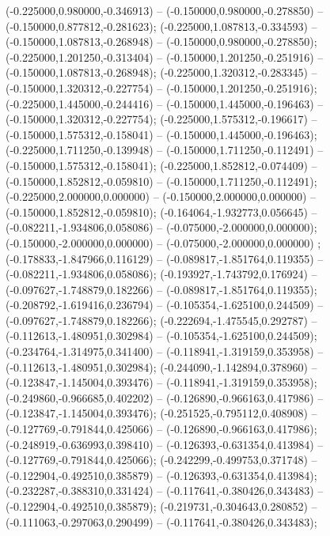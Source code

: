  (-0.225000,0.980000,-0.346913) -- (-0.150000,0.980000,-0.278850) -- (-0.150000,0.877812,-0.281623);
 (-0.225000,1.087813,-0.334593) -- (-0.150000,1.087813,-0.268948) -- (-0.150000,0.980000,-0.278850);
 (-0.225000,1.201250,-0.313404) -- (-0.150000,1.201250,-0.251916) -- (-0.150000,1.087813,-0.268948);
 (-0.225000,1.320312,-0.283345) -- (-0.150000,1.320312,-0.227754) -- (-0.150000,1.201250,-0.251916);
 (-0.225000,1.445000,-0.244416) -- (-0.150000,1.445000,-0.196463) -- (-0.150000,1.320312,-0.227754);
 (-0.225000,1.575312,-0.196617) -- (-0.150000,1.575312,-0.158041) -- (-0.150000,1.445000,-0.196463);
 (-0.225000,1.711250,-0.139948) -- (-0.150000,1.711250,-0.112491) -- (-0.150000,1.575312,-0.158041);
 (-0.225000,1.852812,-0.074409) -- (-0.150000,1.852812,-0.059810) -- (-0.150000,1.711250,-0.112491);
 (-0.225000,2.000000,0.000000) -- (-0.150000,2.000000,0.000000) -- (-0.150000,1.852812,-0.059810);
 (-0.164064,-1.932773,0.056645) -- (-0.082211,-1.934806,0.058086) -- (-0.075000,-2.000000,0.000000);
 (-0.150000,-2.000000,0.000000) -- (-0.075000,-2.000000,0.000000) ;
 (-0.178833,-1.847966,0.116129) -- (-0.089817,-1.851764,0.119355) -- (-0.082211,-1.934806,0.058086);
 (-0.193927,-1.743792,0.176924) -- (-0.097627,-1.748879,0.182266) -- (-0.089817,-1.851764,0.119355);
 (-0.208792,-1.619416,0.236794) -- (-0.105354,-1.625100,0.244509) -- (-0.097627,-1.748879,0.182266);
 (-0.222694,-1.475545,0.292787) -- (-0.112613,-1.480951,0.302984) -- (-0.105354,-1.625100,0.244509);
 (-0.234764,-1.314975,0.341400) -- (-0.118941,-1.319159,0.353958) -- (-0.112613,-1.480951,0.302984);
 (-0.244090,-1.142894,0.378960) -- (-0.123847,-1.145004,0.393476) -- (-0.118941,-1.319159,0.353958);
 (-0.249860,-0.966685,0.402202) -- (-0.126890,-0.966163,0.417986) -- (-0.123847,-1.145004,0.393476);
 (-0.251525,-0.795112,0.408908) -- (-0.127769,-0.791844,0.425066) -- (-0.126890,-0.966163,0.417986);
 (-0.248919,-0.636993,0.398410) -- (-0.126393,-0.631354,0.413984) -- (-0.127769,-0.791844,0.425066);
 (-0.242299,-0.499753,0.371748) -- (-0.122904,-0.492510,0.385879) -- (-0.126393,-0.631354,0.413984);
 (-0.232287,-0.388310,0.331424) -- (-0.117641,-0.380426,0.343483) -- (-0.122904,-0.492510,0.385879);
 (-0.219731,-0.304643,0.280852) -- (-0.111063,-0.297063,0.290499) -- (-0.117641,-0.380426,0.343483);
